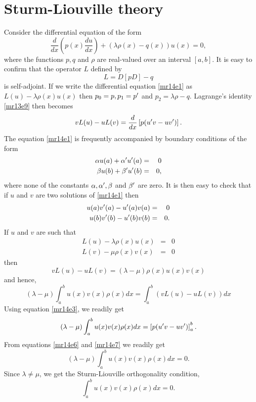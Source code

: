 \section{Sturm-Liouville theory}\label{mr14}
Consider the differential equation of the form
\begin{equation}\label{mr14e1}
\frac{d}{dx}\left(p(x)\frac{du}{dx}\right) + \left(\lambda\rho(x) - q(x)\right)u(x) = 0,
\end{equation}
where the functions $p, q$ and $\rho$ are real-valued over an interval $[a, b]$. It is easy to confirm that the operator $L$ defined by
\begin{equation}\label{mr14e2}
L = D[pD] - q
\end{equation}
is self-adjoint. If we write the differential equation \eqref{mr14e1} as $L(u) - \lambda\rho(x)u(x)$ then $p_0 = p, p_1 = p^\prime$ and $p_2 = \lambda\rho - q$.
Lagrange's identity \eqref{mr13e9} then becomes
\begin{equation}\label{mr14e3}
vL(u) - uL(v) = \frac{d}{dx}\left[p(u^\prime v - uv^\prime)\right].
\end{equation}
The equation \eqref{mr14e1} is frequently accompanied by boundary conditions of the form
\begin{eqnarray}
\alpha u(a) + \alpha^\prime u^\prime(a) &=& 0 \label{mr14e4} \\
\beta u(b) + \beta^\prime u^\prime(b) &=& 0, \label{mr14e5} 
\end{eqnarray}
where none of the constants $\alpha, \alpha^\prime, \beta$ and $\beta^\prime$ are zero. It is then easy to check that if $u$ and $v$ are
two solutions of \eqref{mr14e1} then
\begin{eqnarray}
u(a)v^\prime(a) - u^\prime(a)v(a) &=& 0 \label{mr14e6} \\
u(b)v^\prime(b) - u^\prime(b)v(b) &=& 0 \label{mr14e7}.
\end{eqnarray}
If $u$ and $v$ are such that
\begin{eqnarray*}
L(u) - \lambda\rho(x)u(x) &=& 0 \\
L(v) - \mu\rho(x)v(x) &=& 0 
\end{eqnarray*}
then
\[
vL(u) - uL(v) = (\lambda - \mu)\rho(x)u(x)v(x)
\]
and hence,
\[
(\lambda - \mu)\int_a^b u(x)v(x)\rho(x)dx = \int_a^b \left(vL(u) - uL(v)\right)dx
\]
Using equation \eqref{mr14e3}, we readily get
\[
(\lambda - \mu)\int_a^b u(x)v(x)\rho(x)dx = \left[p(u^\prime v - uv^\prime)\right]_a^b.
\]
From equations \eqref{mr14e6} and \eqref{mr14e7} we readily get
\[
(\lambda - \mu)\int_a^b u(x)v(x)\rho(x)dx = 0.
\]
Since $\lambda \ne \mu$, we get the Sturm-Liouville orthogonality condition,
\begin{equation}\label{mr14e8}
\int_a^b u(x)v(x)\rho(x)dx = 0.
\end{equation}

